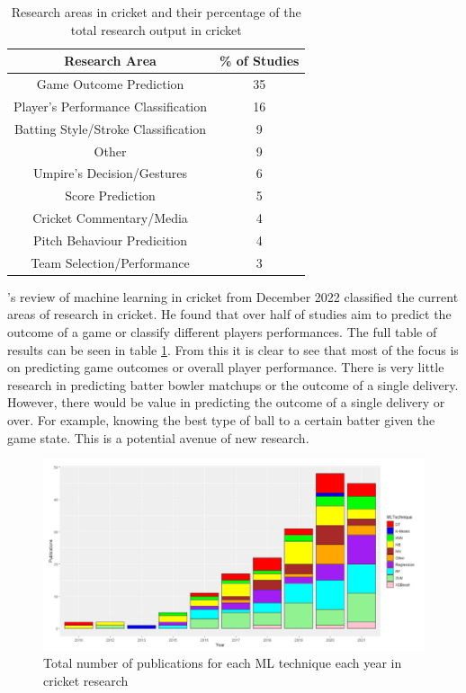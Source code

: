 \documentclass[12pt,a4paper]{report}
\theoremstyle{definition}
\begin{document}
\begin{table}[H] \label{tab:ResearchCrick}
	\centering
	\caption{Research areas in cricket and their percentage of the total research output in cricket \citep{Wickramasinghe2022}}
	\begin{tabular}{| c | c |} 
		\hline
		Research Area & \% of Studies \\ [0.5ex] 
		\hline\hline
		Game Outcome Prediction & 35 \\ 
		\hline
		Player's Performance Classification & 16 \\
		\hline
		Batting Style/Stroke Classification & 9 \\
		\hline
		Other & 9 \\
		\hline
		Umpire's Decision/Gestures & 6 \\
		\hline
		Score Prediction & 5 \\
		\hline
		Cricket Commentary/Media & 4 \\
		\hline
		Pitch Behaviour Predicition & 4 \\
		\hline
		Team Selection/Performance & 3 \\ [1ex] 
		\hline
	\end{tabular}
\end{table}

\citeauthor{Wickramasinghe2022}'s \citeyearpar{Wickramasinghe2022} review of machine learning in cricket from December 2022 classified the current areas of research in cricket. 
He found that over half of studies aim to predict the outcome of a game or classify different players performances. 
The full table of results can be seen in table \ref{tab:ResearchCrick}. 
From this it is clear to see that most of the focus is on predicting game outcomes or overall player performance.
There is very little research in predicting batter bowler matchups or the outcome of a single delivery. 
However, there would be value in predicting the outcome of a single delivery or over. 
For example, knowing the best type of ball to a certain batter given the game state.
This is a potential avenue of new research.

\begin{figure}[H]
    \centering
    \includegraphics[width=\linewidth]{ML_techniques_cricket.png}
    \caption{Total number of publications for each ML technique each year in cricket research \citep{Wickramasinghe2022}}
    \label{fig:NoPapersCricket}
\end{figure}
\end{document}
